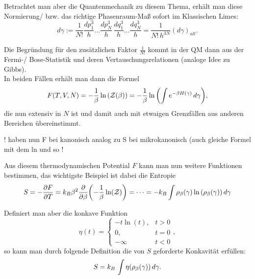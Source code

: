 Betrachtet man aber die Quantenmechanik zu diesem Thema, erhält man diese Normierung/ bzw. das richtige Phasenraum-Maß sofort im Klassischen Limes:
\begin{equation}\label{key}
d\gamma:= \frac{1}{N!} \frac{dp^3_1}{h} \dots \frac{dp^3_N}{h} \, \frac{dq^3_1}{h} \dots \frac{dq^3_N}{h} = \frac{1}{N! \, h^{3N}} (d\gamma)_{alt} .
\end{equation}

Die Begründung für den zusätzlichen Faktor $\frac{1}{N!}$ kommt in der QM dann aus der Fermi-/ Bose-Statistik und deren Vertauschungsrelationen (analoge Idee zu Gibbs).\\


In beiden Fällen erhält man dann die Formel
\begin{equation}\label{key}
F(T, V, N) = -\frac{1}{\beta} \ln\qty(\mathcal{Z}(\beta)) = -\frac{1}{\beta} \ln\qty(\int e^{-\beta H(\gamma)} \, d\gamma) ,
\end{equation}
die nun extensiv in $N$ ist und damit auch mit etwaigen Grenzfällen aus anderen Bereichen übereinstimmt.

! haben nun F bei kanonisch analog zu S bei mikrokanonisch (auch gleiche Formel mit dem ln und so !

Aus diesem thermodynamischen Potential $F$ kann man nun weitere Funktionen bestimmen, das wichtigste Beispiel ist dabei die Entropie
\begin{equation}\label{key}
S = -\pdv{F}{T} = k_B \beta^2 \pdv{\beta}\qty(-\frac{1}{\beta} \ln(\mathcal{Z})) = \dots = - k_B \int \rho_\beta(\gamma) \ln\qty(\rho_\beta(\gamma)) \, d\gamma
\end{equation}

Definiert man aber die konkave Funktion
\begin{equation}\label{key}
\eta(t) = \begin{cases} -t \ln(t), & t > 0 \\ 0, & t = 0 \\ -\infty & t < 0 \end{cases},
\end{equation}
so kann man durch folgende Definition die von $S$ geforderte Konkavität erfüllen:
\begin{equation}\label{key}
S = k_B \, \int \eta\qty(\rho_\beta(\gamma)) \, d\gamma .
\end{equation}



